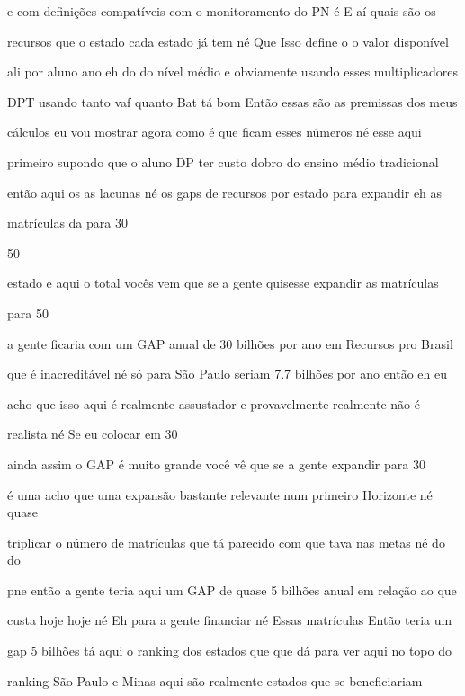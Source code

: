 \documentclass[a4paper,12pt]{article}
\begin{document}
e com definições compatíveis com o monitoramento do PN é E aí quais são os

recursos que o estado cada estado já tem né Que Isso define o o valor disponível

ali por aluno ano eh do do nível médio e obviamente usando esses multiplicadores

DPT usando tanto vaf quanto Bat tá bom Então essas são as premissas dos meus

cálculos eu vou mostrar agora como é que ficam esses números né esse aqui

primeiro supondo que o aluno DP ter custo dobro do ensino médio tradicional

então aqui os as lacunas né os gaps de recursos por estado para expandir eh as

matrículas da para 30%

50%

estado e aqui o total vocês vem que se a gente quisesse expandir as matrículas

para 50%

a gente ficaria com um GAP anual de 30 bilhões por ano em Recursos pro Brasil

que é inacreditável né só para São Paulo seriam 7.7 bilhões por ano então eh eu

acho que isso aqui é realmente assustador e provavelmente realmente não é

realista né Se eu colocar em 30%

ainda assim o GAP é muito grande você vê que se a gente expandir para 30%

é uma acho que uma expansão bastante relevante num primeiro Horizonte né quase

triplicar o número de matrículas que tá parecido com que tava nas metas né do do

pne então a gente teria aqui um GAP de quase 5 bilhões anual em relação ao que

custa hoje hoje né Eh para a gente financiar né Essas matrículas Então teria um

gap 5 bilhões tá aqui o ranking dos estados que que dá para ver aqui no topo do

ranking São Paulo e Minas aqui são realmente estados que se beneficiariam
\end{document}
